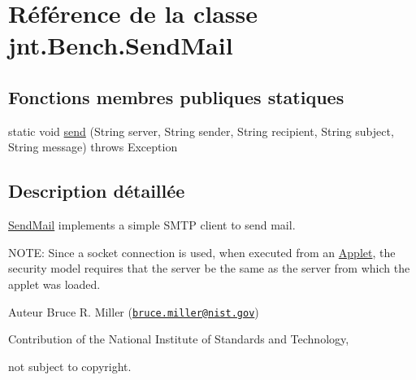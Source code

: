\hypertarget{classjnt_1_1Bench_1_1SendMail}{\section{Référence de la classe jnt.\-Bench.\-Send\-Mail}
\label{classjnt_1_1Bench_1_1SendMail}
}
\subsection*{Fonctions membres publiques statiques}
\begin{DoxyCompactItemize}
\item 
static void \hyperlink{classjnt_1_1Bench_1_1SendMail_a6514c64925df421389926727b16b40cf}{send} (String server, String sender, String recipient, String subject, String message)  throws Exception 
\end{DoxyCompactItemize}


\subsection{Description détaillée}
\hyperlink{classjnt_1_1Bench_1_1SendMail}{Send\-Mail} implements a simple S\-M\-T\-P client to send mail.

N\-O\-T\-E\-: Since a socket connection is used, when executed from an \hyperlink{classjnt_1_1Bench_1_1Applet}{Applet}, the security model requires that the server be the same as the server from which the applet was loaded.

\begin{DoxyAuthor}{Auteur}
Bruce R. Miller (\href{mailto:bruce.miller@nist.gov}{\tt bruce.\-miller@nist.\-gov}) 

Contribution of the National Institute of Standards and Technology, 

not subject to copyright. 
\end{DoxyAuthor}


